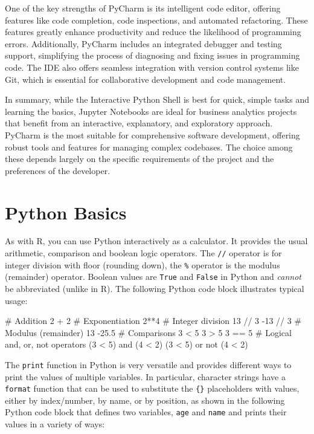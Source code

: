 One of the key strengths of PyCharm is its intelligent code editor, offering features like code completion, code inspections, and automated refactoring. These features greatly enhance productivity and reduce the likelihood of programming errors. Additionally, PyCharm includes an integrated debugger and testing support, simplifying the process of diagnosing and fixing issues in programming code. The IDE also offers seamless integration with version control systems like Git, which is essential for collaborative development and code management.

In summary, while the Interactive Python Shell is best for quick, simple tasks and learning the basics, Jupyter Notebooks are ideal for business analytics projects that benefit from an interactive, explanatory, and exploratory approach. PyCharm is the most suitable for comprehensive software development, offering robust tools and features for managing complex codebases. The choice among these depends largely on the specific requirements of the project and the preferences of the developer.


\section{Python Basics}

As with R, you can use Python interactively as a calculator. It provides the usual arithmetic, comparison and boolean logic operators. The \texttt{//} operator is for integer division with floor (rounding down), the \texttt{\%} operator is the modulus (remainder) operator. Boolean values are \texttt{True} and \texttt{False} in Python and \emph{cannot} be abbreviated (unlike in R). The following Python code block illustrates typical usage:

\begin{samepage}
\begin{pythoncode}
# Addition
2 + 2
# Exponentiation
2**4
# Integer division
13 // 3
-13 // 3
# Modulus (remainder)
13 %
-25.5 %
# Comparisons
3 < 5
3 > 5
3 == 5
# Logical and, or, not operators
(3 < 5) and (4 < 2)
(3 < 5) or not (4 < 2)
\end{pythoncode}
\end{samepage}

The \texttt{print} function in Python is very versatile and provides different ways to print the values of multiple variables. In particular, character strings have a \texttt{format} function that can be used to substitute the \texttt{\{\}} placeholders with values, either by index/number, by name, or by position, as shown in the following Python code block that defines two variables, \texttt{age} and \texttt{name} and prints their values in a variety of ways:

